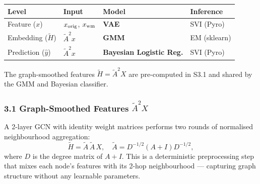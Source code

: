 \documentclass[11pt]{article}
\begin{document}
\begin{longtable}[]{@{}
  >{\raggedright\arraybackslash}p{}
  >{\raggedright\arraybackslash}p{}
  >{\raggedright\arraybackslash}p{}
  >{\raggedright\arraybackslash}p{}@{}}
\toprule\noalign{}
\begin{minipage}[b]{\linewidth}\raggedright
Level
\end{minipage} & \begin{minipage}[b]{\linewidth}\raggedright
Input
\end{minipage} & \begin{minipage}[b]{\linewidth}\raggedright
Model
\end{minipage} & \begin{minipage}[b]{\linewidth}\raggedright
Inference
\end{minipage} \\
\midrule\noalign{}
\endhead
\bottomrule\noalign{}
\endlastfoot
Feature (\(x\)) & \(x_{\rm orig}\), \(x_{\rm wm}\) & \textbf{VAE} & SVI
(Pyro) \\
Embedding (\(\tilde{H}\)) & \(\tilde{A}^2 x\) & \textbf{GMM} & EM
(sklearn) \\
Prediction (\(\hat{y}\)) & \(\tilde{A}^2 x\) & \textbf{Bayesian Logistic
Reg.} & SVI (Pyro) \\
\end{longtable}

The graph-smoothed features \(\tilde{H} = \tilde{A}^2 X\) are
pre-computed in S3.1 and shared by the GMM and Bayesian classifier.

    \subsubsection{\texorpdfstring{3.1 Graph-Smoothed Features
\(\tilde{A}^2 X\)}{3.1 Graph-Smoothed Features \textbackslash tilde\{A\}\^{}2 X}}\label{graph-smoothed-features-tildea2-x}

A 2-layer GCN with identity weight matrices performs two rounds of
normalised neighbourhood aggregation: \[
\tilde{H} = \tilde{A}\,\tilde{A}\,X, \quad
\tilde{A} = D^{-1/2}(A+I)D^{-1/2},
\] where \(D\) is the degree matrix of \(A+I\). This is a deterministic
preprocessing step that mixes each node's features with its 2-hop
neighbourhood --- capturing graph structure without any learnable
parameters.
\end{document}
